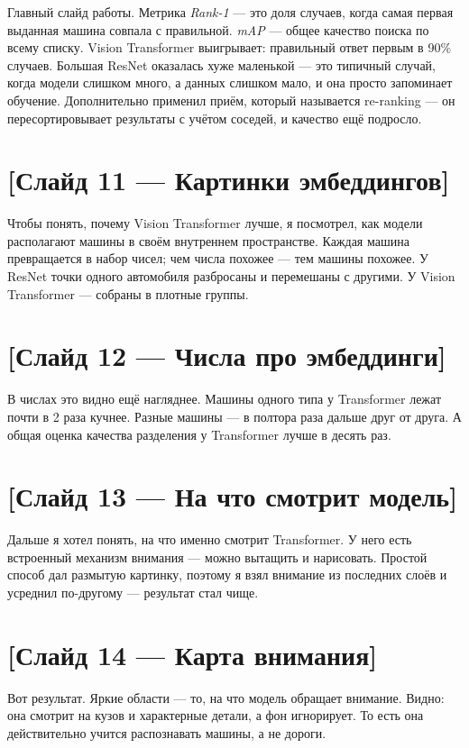 \documentclass[a4paper,12pt]{article}
\begin{document}
Главный слайд работы. Метрика \textit{Rank-1} — это доля случаев, когда самая первая выданная машина совпала с правильной. \textit{mAP} — общее качество поиска по всему списку. Vision Transformer выигрывает: правильный ответ первым в 90\% случаев. Большая ResNet оказалась хуже маленькой — это типичный случай, когда модели слишком много, а данных слишком мало, и она просто запоминает обучение. Дополнительно применил приём, который называется re-ranking — он пересортировывает результаты с учётом соседей, и качество ещё подросло.

\section*{[Слайд 11 — Картинки эмбеддингов]}

Чтобы понять, почему Vision Transformer лучше, я посмотрел, как модели располагают машины в своём внутреннем пространстве. Каждая машина превращается в набор чисел; чем числа похожее — тем машины похожее. У ResNet точки одного автомобиля разбросаны и перемешаны с другими. У Vision Transformer — собраны в плотные группы.

\section*{[Слайд 12 — Числа про эмбеддинги]}

В числах это видно ещё нагляднее. Машины одного типа у Transformer лежат почти в 2 раза кучнее. Разные машины — в полтора раза дальше друг от друга. А общая оценка качества разделения у Transformer лучше в десять раз.

\section*{[Слайд 13 — На что смотрит модель]}

Дальше я хотел понять, на что именно смотрит Transformer. У него есть встроенный механизм внимания — можно вытащить и нарисовать. Простой способ дал размытую картинку, поэтому я взял внимание из последних слоёв и усреднил по-другому — результат стал чище.

\section*{[Слайд 14 — Карта внимания]}

Вот результат. Яркие области — то, на что модель обращает внимание. Видно: она смотрит на кузов и характерные детали, а фон игнорирует. То есть она действительно учится распознавать машины, а не дороги.
\end{document}
